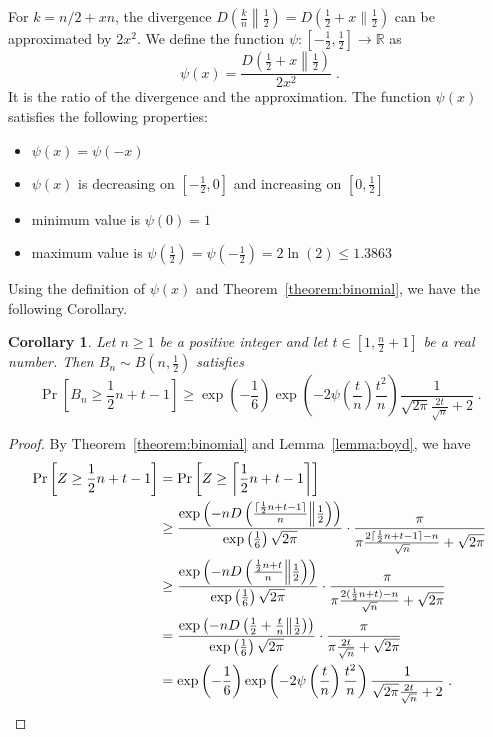 \documentclass{article}
\newcommand{\field}[1]{\mathbb{#1}}
\newcommand{\R}{\field{R}}
\newtheorem{corollary}[theorem]{Corollary}
\begin{document}
For $k=n/2 + xn$, the divergence $D \left( \frac{k}{n} \middle\| \frac{1}{2} \right) = D \left(\frac{1}{2} + x \| \frac{1}{2} \right)$ can be approximated by $2x^2$.
We define the function $\psi:[-\frac{1}{2},\frac{1}{2}] \to \R$ as 
$$
\psi(x) = \frac{D \left(\frac{1}{2}+x \middle\| \frac{1}{2} \right)}{2 x^2} \; .
$$
It is the ratio of the divergence and the approximation. The function $\psi(x)$ satisfies the following properties:
\begin{itemize}
\item $\psi(x) = \psi(-x)$
\item $\psi(x)$ is decreasing on $[-\frac{1}{2}, 0]$ and increasing on $[0, \frac{1}{2}]$
\item minimum value is $\psi(0) = 1$
\item maximum value is $\psi(\frac{1}{2}) = \psi(-\frac{1}{2}) = 2 \ln(2) \le 1.3863$
\end{itemize}
%
Using the definition of $\psi(x)$ and Theorem~\ref{theorem:binomial}, we have the following Corollary.
%
\begin{corollary}
\label{corollary:binomial}
Let $n \ge 1$ be a positive integer and let $t \in [1, \frac{n}{2} + 1]$ be a real number. Then $B_n \sim B(n, \frac{1}{2})$ satisfies
$$
\Pr \left[ B_n \ge \frac{1}{2} n + t - 1 \right] \ge \exp\left(-\frac{1}{6}\right) \exp\left(- 2 \psi\left(\frac{t}{n}\right) \frac{t^2}{n} \right) \frac{1}{\sqrt{2\pi} \frac{2 t}{\sqrt{n}} + 2} \; . 
$$
\end{corollary}
%
\begin{proof}
By Theorem~\ref{theorem:binomial} and Lemma~\ref{lemma:boyd}, we have
\begin{align*}
\Pr \left[ Z \ge  \frac{1}{2} n + t - 1 \right]
& = \Pr \left[ Z \ge \left\lceil \frac{1}{2} n + t - 1 \right\rceil \right] \\
& \ge \frac{\exp\left(-n D \left(\frac{\lceil \frac{1}{2}n + t - 1 \rceil}{n} \middle\| \frac{1}{2} \right)\right)}{\exp\left(\frac{1}{6}\right) \sqrt{2 \pi}} \cdot \frac{\pi}{\pi \frac{2\lceil \frac{1}{2}n + t - 1 \rceil - n}{\sqrt{n}} + \sqrt{2 \pi}} \\
& \ge \frac{\exp\left(-n D \left(\frac{\frac{1}{2}n + t}{n} \middle\| \frac{1}{2} \right)\right)}{\exp\left(\frac{1}{6}\right) \sqrt{2 \pi}} \cdot \frac{\pi}{\pi \frac{2 (\frac{1}{2}n + t) - n}{\sqrt{n}} + \sqrt{2 \pi}} \\
& = \frac{\exp\left(-n D \left(\frac{1}{2} + \frac{t}{n} \middle\| \frac{1}{2} \right)\right)}{\exp\left(\frac{1}{6}\right) \sqrt{2 \pi}} \cdot \frac{\pi}{\pi \frac{2t}{\sqrt{n}} + \sqrt{2 \pi}} \\
& = \exp\left(-\frac{1}{6}\right) \exp\left(- 2 \psi\left(\frac{t}{n}\right) \frac{t^2}{n} \right) \frac{1}{\sqrt{2\pi} \frac{2 t}{\sqrt{n}} + 2} \; . \qedhere
\end{align*}
\end{proof}
\end{document}
